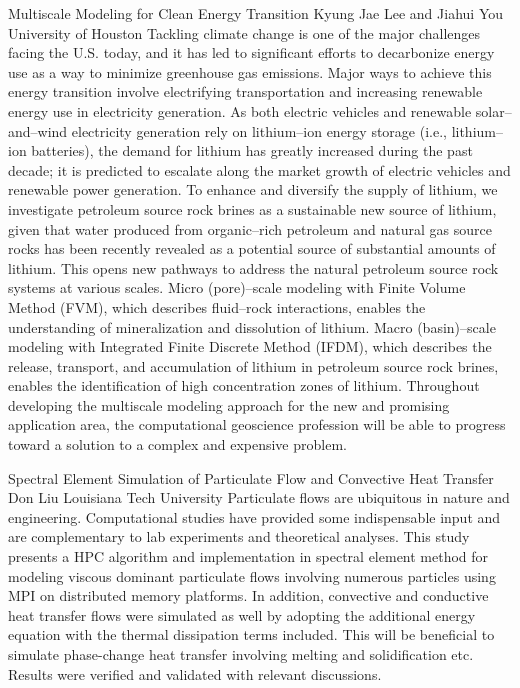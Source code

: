 \begin{addmargin}[2em]{0em}
\vspace{1.5ex}
\abs
{Multiscale Modeling for Clean Energy Transition}
{Kyung Jae Lee and Jiahui You}
{University of Houston}
{Tackling climate change is one of the major challenges facing the U.S. today, and it has led to significant efforts to decarbonize energy use as a way to minimize greenhouse gas emissions. Major ways to achieve this energy transition involve electrifying transportation and increasing renewable energy use in electricity generation. As both electric vehicles and renewable solar–and–wind electricity generation rely on lithium–ion energy storage (i.e., lithium–ion batteries), the demand for lithium has greatly increased during the past decade; it is predicted to escalate along the market growth of electric vehicles and renewable power generation. To enhance and diversify the supply of lithium, we investigate petroleum source rock brines as a sustainable new source of lithium, given that water produced from organic–rich petroleum and natural gas source rocks has been recently revealed as a potential source of substantial amounts of lithium. This opens new pathways to address the natural petroleum source rock systems at various scales. Micro (pore)–scale modeling with Finite Volume Method (FVM), which describes fluid–rock interactions, enables the understanding of mineralization and dissolution of lithium. Macro (basin)–scale modeling with Integrated Finite Discrete Method (IFDM), which describes the release, transport, and accumulation of lithium in petroleum source rock brines, enables the identification of high concentration zones of lithium. Throughout developing the multiscale modeling approach for the new and promising application area, the computational geoscience profession will be able to progress toward a solution to a complex and expensive problem.}

\vspace{1.5ex}
\abs
{Spectral Element Simulation of Particulate Flow and Convective Heat Transfer}
{Don Liu}
{Louisiana Tech University}
{Particulate flows are ubiquitous in nature and engineering. Computational studies have provided some indispensable input and are complementary to lab experiments and theoretical analyses. This study presents a HPC algorithm and implementation in spectral element method for modeling viscous dominant particulate flows involving numerous particles using MPI on distributed memory platforms. In addition, convective and conductive heat transfer flows were simulated as well by adopting the additional energy equation with the thermal dissipation terms included. This will be beneficial to simulate phase-change heat transfer involving melting and solidification etc. Results were verified and validated with relevant discussions.}


\end{addmargin}
